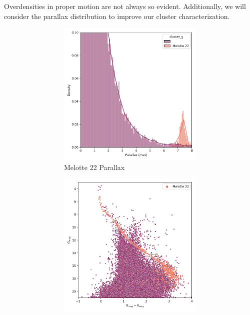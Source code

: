 \documentclass[11pt, a4paper, english]{book}
\begin{document}
Overdensities in proper motion are not always so evident. Additionally, we will consider the parallax distribution to improve our cluster characterization.

\begin{figure}[htbp]
  \centering
  \begin{subfigure}{0.9\textwidth}
    \centering
    \begin{subfigure}[t]{0.45\textwidth}
      \centering
      \includegraphics[width=\textwidth]{../figures/melotte_22/parallax_zoom_melotte_22.png}
      \caption{Melotte 22 Parallax}
      \label{fig:melotte_22_parallax_zoom}
    \end{subfigure}
    \hfill
    \begin{subfigure}[t]{0.45\textwidth}
      \centering
      \includegraphics[width=\textwidth]{../figures/melotte_22/hr_diagram_melotte_22.png}

\end{subfigure}
\end{subfigure}
\end{figure}
\end{document}
